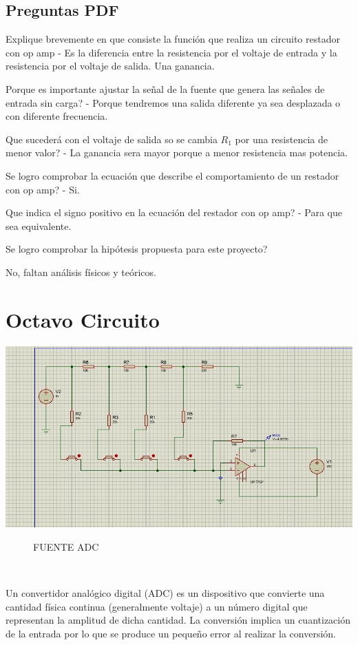 \documentclass[10pt,a4paper]{article}
\begin{document}
\newpage




\subsection{Preguntas PDF}

Explique brevemente en que consiste la función que realiza un circuito restador con op amp - Es la diferencia entre la resistencia por el voltaje de entrada y la resistencia por el voltaje de salida. Una ganancia.

Porque es importante ajustar la señal de la fuente que genera las señales de entrada sin carga? - Porque tendremos una salida diferente ya sea desplazada o con diferente frecuencia.

Que sucederá con el voltaje de salida so se cambia $R_1$ por una resistencia de menor valor? - La ganancia sera mayor porque a menor resistencia mas potencia.

Se logro comprobar la ecuación que describe el comportamiento de un restador con op amp? - Si.

Que indica el signo positivo en la ecuación del restador con op amp? - Para que sea equivalente.

Se logro comprobar la hipótesis propuesta para este proyecto?

No, faltan análisis físicos y teóricos.

\section{Octavo Circuito}
\begin{center}
\includegraphics[scale=0.3]{15.png}
 \begin{figure}[hbtp]
 \caption{FUENTE ADC}
 \centering
 \end{figure}\\
\end{center}
Un convertidor analógico digital (ADC) es un dispositivo que convierte una cantidad física continua (generalmente voltaje) a un número digital que representan la amplitud de dicha cantidad. La conversión implica un cuantización de la entrada por lo que se produce un pequeño error al realizar la conversión.
\end{document}
